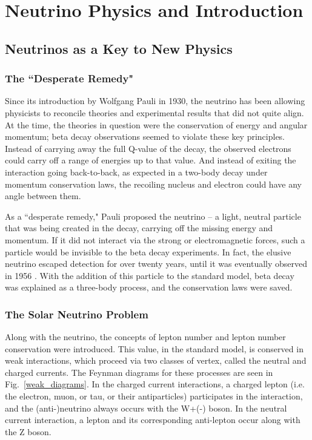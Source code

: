 
\chapter {Neutrino Physics and \nonubb Introduction}
\section{Neutrinos as a Key to New Physics}
\subsection{The ``Desperate Remedy"}
Since its introduction by Wolfgang Pauli in 1930, the neutrino has been allowing physicists to reconcile theories and experimental results that did not quite align. At the time, the theories in question were the conservation of energy and angular momentum; beta decay observations seemed to violate these key principles. Instead of carrying away the full Q-value of the decay, the observed electrons could carry off a range of energies up to that value. And instead of exiting the interaction going back-to-back, as expected in a two-body decay under momentum conservation laws, the recoiling nucleus and electron could have any angle between them. 

As a ``desperate remedy," Pauli proposed the neutrino \cite{Pauli1930}-- a light, neutral particle that was being created in the decay, carrying off the missing energy and momentum. If it did not interact via the strong or electromagnetic forces, such a particle would be invisible to the beta decay experiments. In fact, the elusive neutrino escaped detection for over twenty years, until it was eventually observed in 1956 \cite{Cowan1956}. With the addition of this particle to the standard model, beta decay was explained as a three-body process, and the conservation laws were saved.

\subsection{The Solar Neutrino Problem}
Along with the neutrino, the concepts of lepton number and lepton number conservation were introduced. This value, in the standard model, is conserved in weak interactions, which proceed via two classes of vertex, called the neutral and charged currents. The Feynman diagrams for these processes are seen in Fig.~\ref{weak_diagrams}. In the charged current interactions, a charged lepton (i.e. the electron, muon, or tau, or their antiparticles) participates in the interaction, and the (anti-)neutrino always occurs with the W+(-) boson. In the neutral current interaction, a lepton and its corresponding anti-lepton occur along with the Z boson. 


